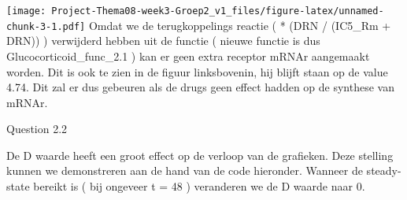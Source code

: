 \documentclass[
]{article}
\newenvironment{Shaded}{\begin{snugshade}}{\end{snugshade}}
\newcommand{\AttributeTok}[1]{\textcolor[rgb]{0.77,0.63,0.00}{#1}}
\newcommand{\DecValTok}[1]{\textcolor[rgb]{0.00,0.00,0.81}{#1}}
\newcommand{\FloatTok}[1]{\textcolor[rgb]{0.00,0.00,0.81}{#1}}
\newcommand{\FunctionTok}[1]{\textcolor[rgb]{0.00,0.00,0.00}{#1}}
\newcommand{\NormalTok}[1]{#1}
\newcommand{\OtherTok}[1]{\textcolor[rgb]{0.56,0.35,0.01}{#1}}
\newcommand{\SpecialCharTok}[1]{\textcolor[rgb]{0.00,0.00,0.00}{#1}}
\newcommand{\StringTok}[1]{\textcolor[rgb]{0.31,0.60,0.02}{#1}}
\begin{document}
\texttt{[image: Project-Thema08-week3-Groep2\_v1\_files/figure-latex/unnamed-chunk-3-1.pdf]}
Omdat we de terugkoppelings reactie ( * (DRN / (IC5\_Rm + DRN)) )
verwijderd hebben uit de functie ( nieuwe functie is dus
Glucocorticoid\_func\_2.1 ) kan er geen extra receptor mRNAr aangemaakt
worden. Dit is ook te zien in de figuur linksbovenin, hij blijft staan
op de value 4.74. Dit zal er dus gebeuren als de drugs geen effect
hadden op de synthese van mRNAr.

\begin{Shaded}
\end{Shaded}

Question 2.2

De D waarde heeft een groot effect op de verloop van de grafieken. Deze
stelling kunnen we demonstreren aan de hand van de code hieronder.
Wanneer de steady-state bereikt is ( bij ongeveer t = 48 ) veranderen we
de D waarde naar 0.
\end{document}
